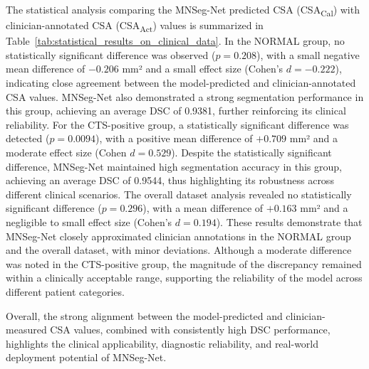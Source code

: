 The statistical analysis comparing the MNSeg-Net predicted CSA (CSA\textsubscript{Cal}) with clinician-annotated CSA (CSA\textsubscript{Act}) values is summarized in Table~\ref{tab:statistical_results_on_clinical_data}. In the NORMAL group, no statistically significant difference was observed (\(p = 0.208\)), with a small negative mean difference of \(-0.206\) mm² and a small effect size (Cohen’s \(d = -0.222\)), indicating close agreement between the model-predicted and clinician-annotated CSA values. MNSeg-Net also demonstrated a strong segmentation performance in this group, achieving an average DSC of 0.9381, further reinforcing its clinical reliability. For the CTS-positive group, a statistically significant difference was detected (\(p = 0.0094\)), with a positive mean difference of \(+0.709\) mm² and a moderate effect size (Cohen \(d = 0.529\)). Despite the statistically significant difference, MNSeg-Net maintained high segmentation accuracy in this group, achieving an average DSC of 0.9544, thus highlighting its robustness across different clinical scenarios. The overall dataset analysis revealed no statistically significant difference (\(p = 0.296\)), with a mean difference of \(+0.163\) mm² and a negligible to small effect size (Cohen’s \(d = 0.194\)). These results demonstrate that MNSeg-Net closely approximated clinician annotations in the NORMAL group and the overall dataset, with minor deviations. Although a moderate difference was noted in the CTS-positive group, the magnitude of the discrepancy remained within a clinically acceptable range, supporting the reliability of the model across different patient categories.

Overall, the strong alignment between the model-predicted and clinician-measured CSA values, combined with consistently high DSC performance, highlights the clinical applicability, diagnostic reliability, and real-world deployment potential of MNSeg-Net.



